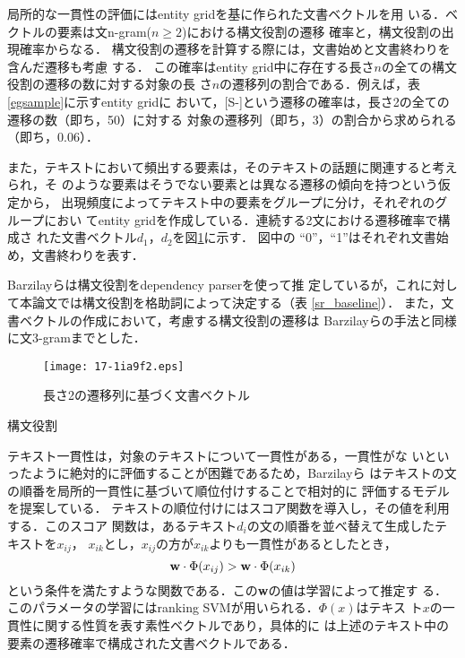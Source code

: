 \documentclass[japanese]{jnlp_1.4}
\begin{document}
  
 局所的な一貫性の評価にはentity gridを基に作られた文書ベクトルを用
 いる．ベクトルの要素は文n-gram($n \ge 2$)における構文役割の遷移
 確率と，構文役割の出現確率からなる．
 構文役割の遷移を計算する際には，文書始めと文書終わりを含んだ遷移も考慮
 する．
 この確率はentity grid中に存在する長さ$n$の全ての構文役割の遷移の数に対する対象の長
 さ$n$の遷移列の割合である．例えば，表\ref{egsample}に示すentity gridに
 おいて，[S-]という遷移の確率は，長さ2の全ての遷移の数（即ち，50）に対する
 対象の遷移列（即ち，3）の割合から求められる（即ち，0.06）．

また，テキストにおいて頻出する要素は，そのテキストの話題に関連すると考えられ，そ
 のような要素はそうでない要素とは異なる遷移の傾向を持つという仮定から，
 出現頻度によってテキスト中の要素をグループに分け，それぞれのグループにおい
 てentity gridを作成している．連続する2文における遷移確率で構成さ
 れた文書ベクトル$d_1$，$d_2$を図\ref{vecsample}に示す．
 図中の ``0''，``1''はそれぞれ文書始め，文書終わりを表す．

 Barzilayらは構文役割をdependency parserを使って推
 定しているが，これに対して本論文では構文役割を格助詞によって決定する（表
 \ref{sr_baseline}）．
 また，文書ベクトルの作成において，考慮する構文役割の遷移は
 Barzilayらの手法と同様に文3-gramまでとした．


 \begin{figure}[b]
   \begin{center}
\texttt{[image: 17-1ia9f2.eps]}
   \end{center}   
  \caption{長さ2の遷移列に基づく文書ベクトル}
\label{vecsample}
 \end{figure}
   \begin{table}[b]
    \caption{構文役割}\label{sr_baseline}

   \end{table}

 テキスト一貫性は，対象のテキストについて一貫性がある，一貫性がな
 いといったように絶対的に評価することが困難であるため，Barzilayら
 はテキストの文の順番を局所的一貫性に基づいて順位付けすることで相対的に
 評価するモデルを提案している．
 テキストの順位付けにはスコア関数を導入し，その値を利用する．このスコア
 関数は，あるテキスト$d_i$の文の順番を並べ替えて生成したテキストを$x_{ij}$，
 $x_{ik}$とし，$x_{ij}$の方が$x_{ik}$よりも一貫性があるとしたとき，
 \[
 {\bf w}\cdot\Phi(x_{ij})>{\bf w}\cdot\Phi(x_{ik})
 \]
 という条件を満たすような関数である．この{\bf w}の値は学習によって推定す
 る．このパラメータの学習にはranking SVMが用いられる．$\Phi(x)$はテキス
ト$x$の一貫性に関する性質を表す素性ベクトルであり，具体的に
は上述のテキスト中の要素の遷移確率で構成された文書ベクトルである．
\end{document}
